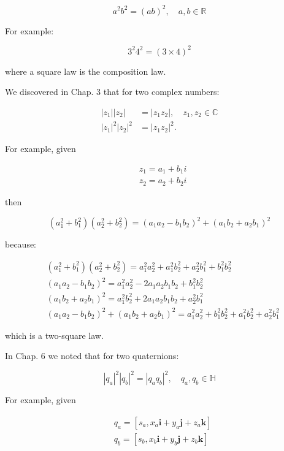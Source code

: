 \documentclass[10pt]{article}
\begin{document}
$$
a^{2} b^{2}=(a b)^{2}, \quad a, b \in \mathbb{R}
$$

For example:

$$
3^{2} 4^{2}=(3 \times 4)^{2}
$$

where a square law is the composition law.

We discovered in Chap. 3 that for two complex numbers:

$$
\begin{aligned}
\left|z_{1}\right|\left|z_{2}\right| & =\left|z_{1} z_{2}\right|, \quad z_{1}, z_{2} \in \mathbb{C} \\
\left|z_{1}\right|^{2}\left|z_{2}\right|^{2} & =\left|z_{1} z_{2}\right|^{2} .
\end{aligned}
$$

For example, given

$$
\begin{aligned}
& z_{1}=a_{1}+b_{1} i \\
& z_{2}=a_{2}+b_{2} i
\end{aligned}
$$

then

$$
\left(a_{1}^{2}+b_{1}^{2}\right)\left(a_{2}^{2}+b_{2}^{2}\right)=\left(a_{1} a_{2}-b_{1} b_{2}\right)^{2}+\left(a_{1} b_{2}+a_{2} b_{1}\right)^{2}
$$

because:

$$
\begin{aligned}
&\left(a_{1}^{2}+b_{1}^{2}\right)\left(a_{2}^{2}+b_{2}^{2}\right)=a_{1}^{2} a_{2}^{2}+a_{1}^{2} b_{2}^{2}+a_{2}^{2} b_{1}^{2}+b_{1}^{2} b_{2}^{2} \\
&\left(a_{1} a_{2}-b_{1} b_{2}\right)^{2}=a_{1}^{2} a_{2}^{2}-2 a_{1} a_{2} b_{1} b_{2}+b_{1}^{2} b_{2}^{2} \\
&\left(a_{1} b_{2}+a_{2} b_{1}\right)^{2}=a_{1}^{2} b_{2}^{2}+2 a_{1} a_{2} b_{1} b_{2}+a_{2}^{2} b_{1}^{2} \\
&\left(a_{1} a_{2}-b_{1} b_{2}\right)^{2}+\left(a_{1} b_{2}+a_{2} b_{1}\right)^{2}=a_{1}^{2} a_{2}^{2}+b_{1}^{2} b_{2}^{2}+a_{1}^{2} b_{2}^{2}+a_{2}^{2} b_{1}^{2}
\end{aligned}
$$

which is a two-square law.

In Chap. 6 we noted that for two quaternions:

$$
\left|q_{a}\right|^{2}\left|q_{b}\right|^{2}=\left|q_{a} q_{b}\right|^{2}, \quad q_{a}, q_{b} \in \mathbb{H}
$$

For example, given

$$
\begin{aligned}
& q_{a}=\left[s_{a}, x_{a} \mathbf{i}+y_{a} \mathbf{j}+z_{a} \mathbf{k}\right] \\
& q_{b}=\left[s_{b}, x_{b} \mathbf{i}+y_{b} \mathbf{j}+z_{b} \mathbf{k}\right]
\end{aligned}
$$
\end{document}
